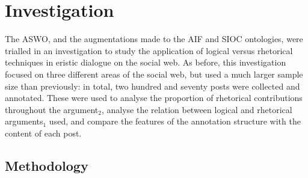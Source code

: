 

\section{Investigation}
\label{aswo:investigation}
The ASWO, and the augmentations made to the AIF and SIOC ontologies, were trialled in an investigation to study the application of logical versus rhetorical techniques in eristic dialogue on the social web. As before, this investigation focused on three different areas of the social web, but used a much larger sample size than previously: in total, two hundred and seventy posts were collected and annotated. These were used to analyse the proportion of rhetorical contributions throughout the argument$_2$, analyse the relation between logical and rhetorical arguments$_1$ used, and compare the features of the annotation structure with the content of each post.


\subsection{Methodology}

